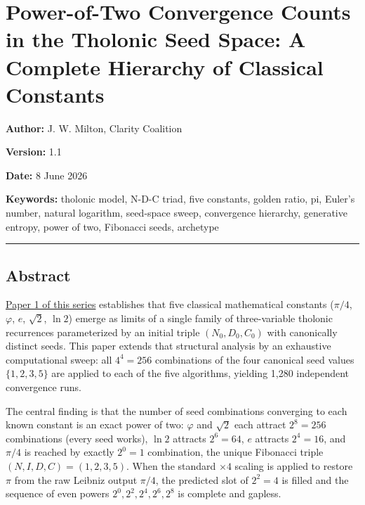 \documentclass[
  11pt,
  letterpaper,
]{article}
\author{}
\date{}
\begin{document}
\section{Power-of-Two Convergence Counts in the Tholonic Seed Space: A
Complete Hierarchy of Classical
Constants}\label{power-of-two-convergence-counts-in-the-tholonic-seed-space-a-complete-hierarchy-of-classical-constants}

\textbf{Author:} J. W. Milton, Clarity Coalition

\textbf{Version:} 1.1

\textbf{Date:} 8 June 2026

\textbf{Keywords:} tholonic model, N-D-C triad, five constants, golden
ratio, pi, Euler's number, natural logarithm, seed-space sweep,
convergence hierarchy, generative entropy, power of two, Fibonacci
seeds, archetype

\begin{center}\rule{0.5\linewidth}{0.5pt}\end{center}

\subsection{Abstract}\label{abstract}

\href{https://github.com/baardev/truevalue/blob/main/docnav/Research/papers/1_recursive-tholonic-five-constants/1_recursive-tholonic-five-constants.pdf}{Paper
1 of this series} establishes that five classical mathematical constants
(\(\pi/4\), \(\varphi\), \(e\), \(\sqrt{2}\), \(\ln 2\)) emerge as
limits of a single family of three-variable tholonic recurrences
parameterized by an initial triple \((N_0, D_0, C_0)\) with canonically
distinct seeds. This paper extends that structural analysis by an
exhaustive computational sweep: all \(4^4 = 256\) combinations of the
four canonical seed values \(\{1, 2, 3, 5\}\) are applied to each of the
five algorithms, yielding 1,280 independent convergence runs.

The central finding is that the number of seed combinations converging
to each known constant is an exact power of two: \(\varphi\) and
\(\sqrt{2}\) each attract \(2^8 = 256\) combinations (every seed works),
\(\ln 2\) attracts \(2^6 = 64\), \(e\) attracts \(2^4 = 16\), and
\(\pi/4\) is reached by exactly \(2^0 = 1\) combination, the unique
Fibonacci triple \((N, I, D, C) = (1, 2, 3, 5)\). When the standard
\(\times 4\) scaling is applied to restore \(\pi\) from the raw Leibniz
output \(\pi/4\), the predicted slot of \(2^2 = 4\) is filled and the
sequence of even powers \(2^0, 2^2, 2^4, 2^6, 2^8\) is complete and
gapless.
\end{document}
